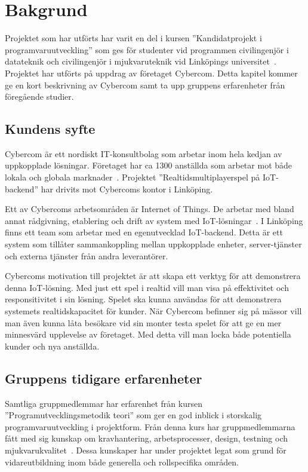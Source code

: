 \chapter{Bakgrund}
\label{cha:background}
Projektet som har utförts har varit en del i kursen ''Kandidatprojekt i programvaruutveckling'' som ges för studenter vid programmen civilingenjör i datateknik och civilingenjör i mjukvaruteknik vid Linköpings universitet~\cite{tddd96}. Projektet har utförts på uppdrag av företaget Cybercom. Detta kapitel kommer ge en kort beskrivning av Cybercom samt ta upp gruppens erfarenheter från föregående studier.

\section{Kundens syfte}
\label{sec:customer-aim}
Cybercom är ett nordiskt IT-konsultbolag som arbetar inom hela kedjan av uppkopplade lösningar. Företaget har ca 1300 anställda som arbetar mot både lokala och globala marknader~\cite{cybercomgroup}. Projektet ''Realtidsmultiplayerspel på IoT-backend'' har drivits mot Cybercoms kontor i Linköping.

Ett av Cybercoms arbetsområden är Internet of Things. De arbetar med bland annat rådgivning, etablering och drift av system med IoT-lösningar~\cite{cybercomiot}. I Linköping finns ett team som arbetar med en egenutvecklad IoT-backend. Detta är ett system som tillåter sammankoppling mellan uppkopplade enheter, server-tjänster och externa tjänster från andra leverantörer.

Cybercoms motivation till projektet är att skapa ett verktyg för att demonstrera denna IoT-lösning. Med just ett spel i realtid vill man visa på effektivitet och responsitivitet i sin lösning. Spelet ska kunna användas för att demonstrera systemets realtidskapacitet för kunder. När Cybercom befinner sig på mässor vill man även kunna låta besökare vid sin monter testa spelet för att ge en mer minnesvärd upplevelse av företaget. Med detta vill man locka både potentiella kunder och nya anställda.

\section{Gruppens tidigare erfarenheter}
\label{sec:earlier-experience}
Samtliga gruppmedlemmar har erfarenhet från kursen ''Programutvecklingsmetodik teori'' som ger en god inblick i storskalig programvaruutveckling i projektform. Från denna kurs har gruppmedlemmarna fått med sig kunskap om kravhantering, arbetsprocesser, design, testning och mjukvarukvalitet~\cite{tddc93}. Dessa kunskaper har under projektet legat som grund för vidareutbildning inom både generella och rollspecifika områden.

